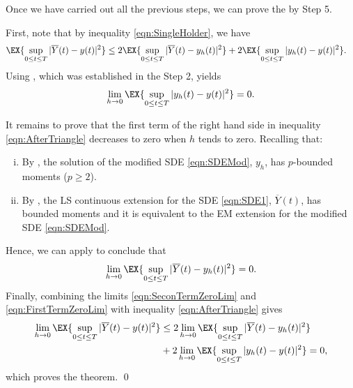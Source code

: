 \documentclass[sort&compress, preprint]{elsarticle}
\theoremstyle{definition}
\theoremstyle{plain}%
\theoremstyle{remark}
\newcommand{\SM}{LS\xspace}
\begin{document}
	Once we have carried out all the previous steps, we can prove the  by Step 5.%
\begin{pf}
	First,  note that by inequality \eqref{eqn:SingleHolder}, we have
	\begin{align}\label{eqn:AfterTriangle}
		\EX{\sup_{0\leq t \leq T}|\overline{Y}(t) - y(t)|^2}
		&\leq
		2\EX{
			\sup_{0\leq t \leq T}
			|\overline{Y}(t) - y_h(t)|^2
		}
		+
		2\EX{
			\sup_{0\leq t \leq T}
			|y_h(t) - y(t)|^2
		}.
	\end{align}
	Using , which was established in the Step 2, yields
	\begin{equation}\label{eqn:SeconTermZeroLim}
		\lim_{h\to 0}
		\EX{
			\sup_{0\leq t \leq T}
			|y_h(t) - y(t)|^2
		} = 0.
	\end{equation}
	
		It remains to prove that the first term of the right hand side in inequality \eqref{eqn:AfterTriangle} 
		decreases to zero
	when $h$ tends to zero. Recalling that:
	\begin{enumerate}[i)]
		\item 
			By , the solution of the modified SDE \eqref{eqn:SDEMod}, $y_h$, has
			$p$-bounded moments ($p\geq 2$).
		\item
			By , the \SM continuous extension for the SDE \eqref{eqn:SDE1},
			$\overline{Y}(t)$, has bounded moments and it is equivalent to the EM extension for the modified SDE 
			\eqref{eqn:SDEMod}.
	\end{enumerate}
	Hence, we can apply 
	 to conclude that
	\begin{equation}\label{eqn:FirstTermZeroLim}
		\lim_{h\to 0}
		\EX{
			\sup_{0\leq t \leq T}
			|\overline{Y}(t) - y_h(t)|^2
		} = 0.
	\end{equation}
	Finally, combining the limits \eqref{eqn:SeconTermZeroLim} and \eqref{eqn:FirstTermZeroLim} with 
	inequality \eqref{eqn:AfterTriangle} gives
	\begin{align*}
		\lim_{h \to 0}
		\EX{
			\sup_{0\leq t \leq T}
			|\overline{Y}(t) - y(t)|^2
		}
		&\leq	
		2\lim_{h\to 0}
		\EX{
			\sup_{0\leq t \leq T}
			|\overline{Y}(t) - y_h(t)|^2
		}
		\\
		&
		+
		2\lim_{h\to 0}
		\EX{
			\sup_{0\leq t \leq T}
			|y_h(t) - y(t)|^2
		} = 0,
	\end{align*}
	which proves the theorem. \qed
\end{pf}
%
\end{document}
